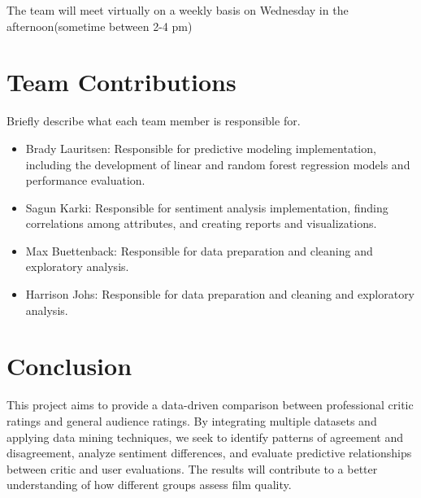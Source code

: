 \documentclass[conference]{IEEEtran}
\begin{document}
The team will meet virtually on a weekly basis on Wednesday in the afternoon(sometime between 2-4 pm)

\section{Team Contributions}
Briefly describe what each team member is responsible for.

\begin{itemize}
  \item Brady Lauritsen: Responsible for predictive modeling implementation, including the development of linear and random forest regression models and performance evaluation.
  \item Sagun Karki: Responsible for sentiment analysis implementation, finding correlations among attributes, and creating reports and visualizations.
  \item Max Buettenback: Responsible for data preparation and cleaning and exploratory analysis.
  \item Harrison Johs: Responsible for data preparation and cleaning and exploratory analysis.
\end{itemize}



\section{Conclusion}

This project aims to provide a data-driven comparison between
professional critic ratings and general audience ratings. By
integrating multiple datasets and applying data mining techniques,
we seek to identify patterns of agreement and disagreement, analyze
sentiment differences, and evaluate predictive relationships between
critic and user evaluations. The results will contribute to a better
understanding of how different groups assess film quality.



\end{document}
